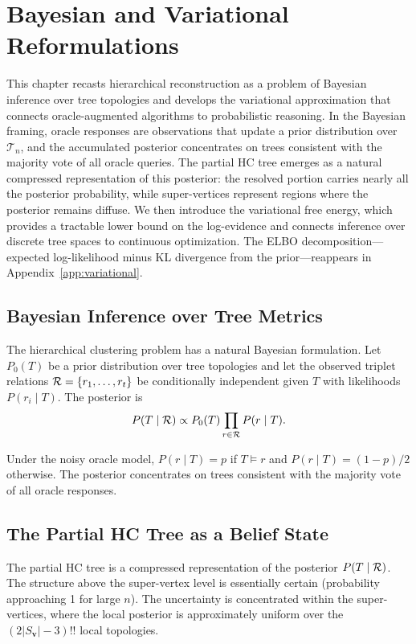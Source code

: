 \chapter{Bayesian and Variational Reformulations}
\label{ch:bayesian}

This chapter recasts hierarchical reconstruction as a problem of Bayesian inference over tree topologies and develops the variational approximation that connects oracle-augmented algorithms to probabilistic reasoning. In the Bayesian framing, oracle responses are observations that update a prior distribution over $\mathcal{T}_n$, and the accumulated posterior concentrates on trees consistent with the majority vote of all oracle queries. The partial HC tree emerges as a natural compressed representation of this posterior: the resolved portion carries nearly all the posterior probability, while super-vertices represent regions where the posterior remains diffuse. We then introduce the variational free energy, which provides a tractable lower bound on the log-evidence and connects inference over discrete tree spaces to continuous optimization. The ELBO decomposition---expected log-likelihood minus KL divergence from the prior---reappears in Appendix~\ref{app:variational}.



\section{Bayesian Inference over Tree Metrics}

The hierarchical clustering problem has a natural Bayesian formulation. Let $P_0(T)$ be a prior distribution over tree topologies and let the observed triplet relations $\mathcal{R} = \{r_1, \ldots, r_t\}$ be conditionally independent given $T$ with likelihoods $P(r_i \mid T)$. The posterior is
\[
P(T \mid \mathcal{R}) \propto P_0(T) \prod_{r \in \mathcal{R}} P(r \mid T).
\]

Under the noisy oracle model, $P(r \mid T) = p$ if $T \models r$ and $P(r \mid T) = (1-p)/2$ otherwise. The posterior concentrates on trees consistent with the majority vote of all oracle responses.

\section{The Partial HC Tree as a Belief State}

The partial HC tree is a compressed representation of the posterior $P(T \mid \mathcal{R})$. The structure above the super-vertex level is essentially certain (probability approaching 1 for large $n$). The uncertainty is concentrated within the super-vertices, where the local posterior is approximately uniform over the $(2|S_\mathbf{v}| - 3)!!$ local topologies.


